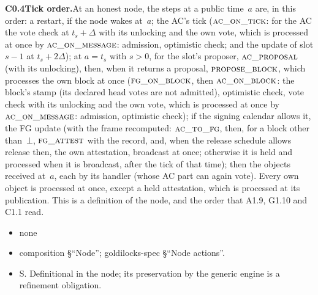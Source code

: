 \documentclass{article}
\newcommand{\fname}[1]{\text{\textsc{#1}}}
\newcommand{\dagnode}[6]{%
\par\medskip\noindent\textbf{#1\enspace #2.}\enspace #3
\begin{itemize}[leftmargin=2.2em,itemsep=0pt,topsep=2pt]
\item[\emph{Uses}] #4
\item[\emph{Evid.}] #5
\item[\emph{Task}] #6
\end{itemize}}
\begin{document}
\dagnode{C0.4}{Tick order}{At an honest node, the steps at a public time~$a$
are, in this order: a restart, if the node wakes at~$a$; the AC's tick
($\fname{ac\_on\_tick}$: for the AC the vote check at $t_s+\Delta$ with its
unlocking and the own vote, which is processed at once by
$\fname{ac\_on\_message}$: admission, optimistic check; and the update of slot
$s-1$ at $t_s+2\Delta$); at $a=t_s$ with $s>0$, for the slot's proposer,
$\fname{ac\_proposal}$ (with its unlocking), then, when it returns a proposal,
$\fname{propose\_block}$, which processes the own block at once
($\fname{fg\_on\_block}$, then $\fname{ac\_on\_block}$: the block's stamp (its
declared head votes are not admitted), optimistic check, vote check with its unlocking and the own vote,
which is processed at once by $\fname{ac\_on\_message}$: admission, optimistic
check); if the signing calendar allows it, the FG update (with the frame
recomputed: $\fname{ac\_to\_fg}$, then, for a block other
than~$\bot$, $\fname{fg\_attest}$ with the record, and, when the release
schedule allows release then, the own attestation, broadcast at once;
otherwise it is held and processed when it is broadcast, after the tick of
that time); then
the objects received at~$a$, each by its handler (whose AC part can again
vote).  Every own object is processed at once, except a held attestation,
which is processed at its publication.  This is a definition of the
node, and the order that A1.9, G1.10 and C1.1 read.}
{none}{composition \S``Node''; goldilocks-spec \S``Node actions''.}{S.  Definitional in
the node; its preservation by the generic engine is a refinement obligation.}
\end{document}
